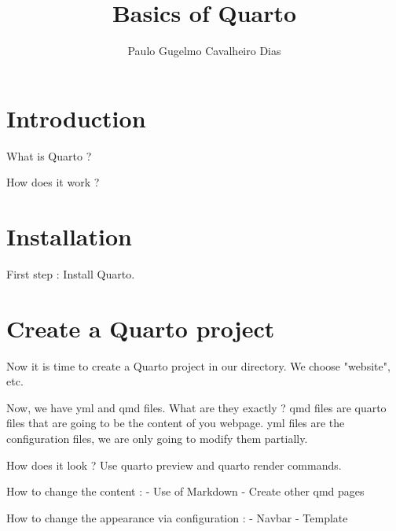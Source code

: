 \documentclass{beamer}
\title{Basics of Quarto}
\author{Paulo Gugelmo Cavalheiro Dias}
\begin{document}
\section{Introduction}

    \begin{frame}
        What is Quarto ? 
    \end{frame}
    
    \begin{frame}
        How does it work ?
    \end{frame}

\section{Installation}

    \begin{frame}
        First step : Install Quarto. 
    \end{frame}

\section{Create a Quarto project}

    \begin{frame}
        Now it is time to create a Quarto project in our directory. We choose "website", etc. 
    \end{frame}

    \begin{frame}
        Now, we have yml and qmd files. What are they exactly ?
        qmd files are quarto files that are going to be the content of you webpage.
        yml files are the configuration files, we are only going to modify them partially.
    \end{frame}

    \begin{frame}
        How does it look ? Use quarto preview and quarto render commands.
    \end{frame}

    \begin{frame}
        How to change the content :
        - Use of Markdown
        - Create other qmd pages
    \end{frame}

    \begin{frame}
        How to change the appearance via configuration : 
        - Navbar
        - Template
    \end{frame}
\end{document}

